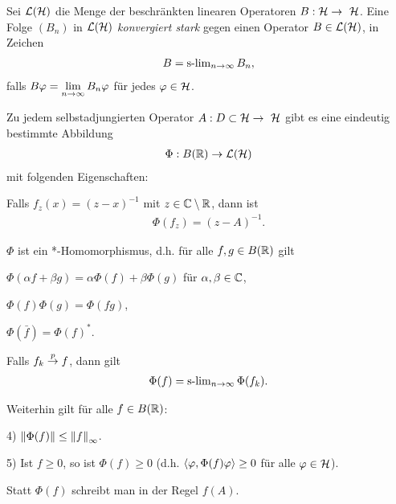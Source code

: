 \begin{defn*}
Sei $\mathcal{L}(\mathcal{H})$ die Menge der beschränkten linearen Operatoren $B:\mathcal{H}\to~\mathcal{H}$.
Eine Folge $(B_n)$ in $\mathcal{L}(\mathcal{H})$ \emph{konvergiert
stark}
gegen einen Operator $B\in \mathcal{L}(\mathcal{H})$, in Zeichen
\begin{align*}
B = \operatorname{s-lim}\limits_{n\to\infty} B_n,
\end{align*}
falls $B\varphi =\lim\limits_{n\to\infty} B_n\varphi$ für jedes $\varphi\in\mathcal{H}$.\fishhere
\end{defn*}

\begin{thm}
\label{prop:6.2}
Zu jedem selbstadjungierten Operator $A: D\subset\mathcal{H}\to~\mathcal{H}$ gibt es eine
eindeutig bestimmte Abbildung
\begin{align*}
\Phi: B(\mathbb{R})\to\mathcal{L}(\mathcal{H})
\end{align*}
mit folgenden Eigenschaften:
\begin{propenum}
\item\label{prop:6.2:1} Falls $f_z(x) = (z-x)^{-1}$ mit $z\in\mathbb{C}\setminus \mathbb{R}$,
dann ist
\begin{align*}
\Phi(f_z) = (z-A)^{-1}.
\end{align*}
\item\label{prop:6.2:2} $\Phi$ ist ein *-Homomorphismus, d.h. für alle $f,g\in
B(\mathbb{R})$ gilt
\begin{equivenum}
\item $\Phi(\alpha f + \beta g) = \alpha \Phi(f) + \beta \Phi(g)$ für
$\alpha,\beta\in\mathbb{C}$,
\item $\Phi(f)\Phi(g) = \Phi(fg)$,
\item $\Phi(\bar{f}) = \Phi(f)^*$.
\end{equivenum}
\item\label{prop:6.2:3} Falls $f_k\overset{p}{\to} f$, dann gilt
\begin{align*}
\Phi(f) = \operatorname{s-lim}\limits_{n\to\infty} \Phi(f_k).
\end{align*}
\end{propenum}
Weiterhin gilt für alle $f\in B(\mathbb{R})$:
\begin{propenum}
\item[4)]\label{prop:6.2:4} $\left\|\Phi(f)\right\| \le \left\|f\right\|_\infty$.
\item[5)]\label{prop:6.2:5} Ist $f\ge 0$, so ist $\Phi(f)\ge 0$ (d.h.
$\left\langle\varphi,\Phi(f)\varphi\right\rangle \ge 0$ für alle $\varphi\in\mathcal{H}$).
\end{propenum}
Statt $\Phi(f)$ schreibt man in der Regel $f(A)$.\fishhere
\end{thm}

